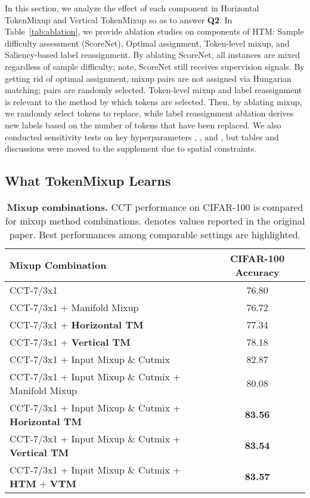 \documentclass{article}
\begin{document}
In this section, we analyze the effect of each component in Horizontal TokenMixup and Vertical TokenMixup so as to answer \textbf{Q2}.
In Table~\ref{tab:ablation}, we provide ablation studies on components of HTM: Sample difficulty assessment (ScoreNet), Optimal assignment, Token-level mixup, and Saliency-based label reassignment.
By ablating ScoreNet, all instances are mixed regardless of sample difficulty; note, ScoreNet still receives supervision signals.
By getting rid of optimal assignment, mixup pairs are not assigned via Hungarian matching; pairs are randomly selected.
Token-level mixup and label reassignment is relevant to the method by which tokens are selected.
Then, by ablating mixup, we randomly select tokens to replace, while label reassignment ablation derives new labels based on the number of tokens that have been replaced.
We also conducted sensitivity tests on key hyperparameters , , and , but tables and discussions were moved to the supplement due to spatial constraints. 
\subsection{What TokenMixup Learns}
\label{sec:analysis_learn}
\begin{table}

\centering
\caption{\footnotesize \textbf{Mixup combinations.}  CCT performance on CIFAR-100 is compared for mixup method combinations.  denotes values reported in the original paper. Best performances among comparable settings are highlighted.}
\label{tab:manifold}
\begin{adjustbox}{width=0.7\textwidth}
\begin{tabular}{l | c}
\toprule
\textbf{Mixup Combination} & \textbf{CIFAR-100 Accuracy} \\
\midrule
CCT-7/3x1 & 76.80 \\
CCT-7/3x1 + Manifold Mixup & 76.72 \\
CCT-7/3x1 + \textbf{Horizontal TM} & 77.34 \\
CCT-7/3x1 + \textbf{Vertical TM} & \cellcolor{yellow!25} 78.18  \\
CCT-7/3x1 + Input Mixup \& Cutmix  & 82.87 \\
CCT-7/3x1 + Input Mixup \& Cutmix + Manifold Mixup & 80.08 \\
CCT-7/3x1 + Input Mixup \& Cutmix + \textbf{Horizontal TM} & \textbf{83.56} \\
CCT-7/3x1 + Input Mixup \& Cutmix + \textbf{Vertical TM} & \textbf{83.54} \\
CCT-7/3x1 + Input Mixup \& Cutmix + \textbf{HTM} + \textbf{VTM} & \cellcolor{yellow!25}\textbf{83.57} \\

\bottomrule
\end{tabular}
\end{adjustbox}

\end{table}
\end{document}
